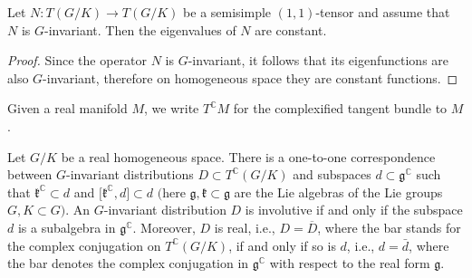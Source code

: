 \begin{Lemma}\label{L1}Let $N\colon T(G/K) \to T(G/K)$ be a semisimple $(1,1)$-tensor and assume that $N$ is $G$-invariant. Then the eigenvalues of $N$ are constant.
\end{Lemma}
\begin{proof}Since the operator $N$ is $G$-invariant, it follows that its eigenfunctions are also $G$-invariant, therefore on homogeneous space they are constant functions.
\end{proof}

Given a real manifold $M$, we write $T^\mathbb{C} M$ for the complexified tangent bundle to $M$.

\begin{Lemma}\label{L3}Let $G/K$ be a real homogeneous space. There is a one-to-one correspondence between $G$-invariant distributions $D \subset T^\mathbb{C}(G/K)$ and subspaces $ d \subset\mathfrak{g}^\mathbb{C}$ such that $\mathfrak{k}^\mathbb{C} \subset d$ and $\big[\mathfrak{k}^\mathbb{C}, d\big]\subset d$ $($here $\mathfrak{g},\mathfrak{k} \subset\mathfrak{g}$ are the Lie algebras of the Lie groups $G, K \subset G)$. An $G$-invariant distribution $D$ is involutive if and only if the subspace $ d$ is a subalgebra in $\mathfrak{g}^\mathbb{C}$. Moreover, $D$ is real, i.e., $D=\overline D$, where the bar stands for the complex conjugation on $T^\mathbb{C}(G/K)$, if and only if so is $ d$, i.e., $d=\bar d$, where the bar denotes the complex conjugation in $\mathfrak{g}^\mathbb{C}$ with respect to the real form $\mathfrak{g}$.
\end{Lemma}

